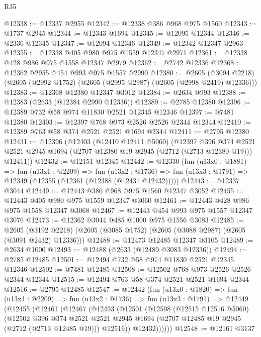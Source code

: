 \begin{lexlean}{R35}
\begin{coremodule}
@12338 := @12337 @2955
@12342 := @12338 @386 @968 @975 @1560
@12343 := @1737 @2945
@12344 := @12343 @1694
@12345 := @12095 @12344
@12346 := @2336 @12345
@12347 := @12094 @12346
@12349 := @12342 @12347 @2963
@12355 := @12338 @405 @980 @975 @1559 @12347 @2971
@12361 := @12338 @428 @986 @975 @1558 @12347 @2979
@12362 := @2742 @12336
@12368 := @12362 @2955 @454 @993 @975 @1557 @2990
@12380 := @2605
    (@3094 @2218)
    (@2605 (@2992 @1752) (@2605 (@2995 @2987) (@2605 (@2998 @2419) @12336)))
@12383 := @12368 @12380 @12347 @3012
@12384 := @2634 @993
@12388 := @12383 (@2633 (@12384 @2990 @12336))
@12389 := @2785 @12380
@12396 := @12389 @732 @58 @974 @11830 @2521 @12345 @12346
@12397 := @7481 @12380
@12403 := @12397 @768 @973 @2526 @2526 @2344 @12344
@12410 := @12389 @763 @58 @374 @2521 @2521 @1694 @2344
@12411 := @2795 @12380
@12431 := @12396
    (@12403
      (@12410 @12411 @5060)
      (@12397
        @396
        @374
        @2521
        @2521
        @2945
        @1694
        (@2707 @12380 @19 @2945 (@2712 (@2713 @12380 @19)))
        @12411))
@12432 := @12151 @12345
@12442 := @12330
    (fun (u13x0 : @1881) =>
    fun (u13x1 : @2209) =>
    fun (u13x2 : @1736) => fun (u13x3 : @1791) => @12349 (@12355 (@12361 (@12388 (@12431 @12432)))))
@12443 := @12337 @3044
@12449 := @12443 @386 @968 @975 @1560 @12347 @3052
@12455 := @12443 @405 @980 @975 @1559 @12347 @3060
@12461 := @12443 @428 @986 @975 @1558 @12347 @3068
@12467 := @12443 @454 @993 @975 @1557 @12347 @3076
@12473 := @12362 @3044 @485 @1000 @975 @1556 @3083
@12485 := @2605
    (@3192 @2218)
    (@2605 (@3085 @1752) (@2605 (@3088 @2987) (@2605 (@3091 @2432) @12336)))
@12488 := @12473 @12485 @12347 @3105
@12489 := @2634 @1000
@12493 := @12488 (@2633 (@12489 @3083 @12336))
@12494 := @2785 @12485
@12501 := @12494 @732 @58 @974 @11830 @2521 @12345 @12346
@12502 := @7481 @12485
@12508 := @12502 @768 @973 @2526 @2526 @2344 @12344
@12515 := @12494 @763 @58 @374 @2521 @2521 @1694 @2344
@12516 := @2795 @12485
@12547 := @12442
    (fun (u13x0 : @1820) =>
    fun (u13x1 : @2209) =>
    fun (u13x2 : @1736) =>
    fun (u13x3 : @1791) =>
    @12449
      (@12455
        (@12461
          (@12467
            (@12493
              (@12501
                (@12508
                  (@12515 @12516 @5060)
                  (@12502
                    @396
                    @374
                    @2521
                    @2521
                    @2945
                    @1694
                    (@2707 @12485 @19 @2945 (@2712 (@2713 @12485 @19)))
                    @12516))
                @12432))))))
@12548 := @12161 @3137

\end{coremodule}
\end{lexlean}
